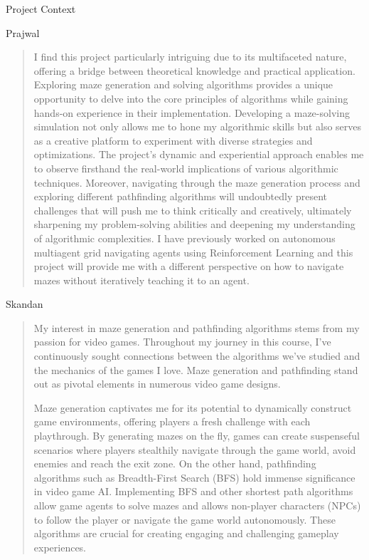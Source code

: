 \documentclass{amsart}
\begin{document}
\begin{section}{Project Context}
    \begin{subsection}{Prajwal}
        \begin{quote}
            I find this project particularly intriguing due to its multifaceted nature, offering a bridge between theoretical knowledge and practical application. Exploring maze generation and solving algorithms provides a unique opportunity to delve into the core principles of algorithms while gaining hands-on experience in their implementation. Developing a maze-solving simulation not only allows me to hone my algorithmic skills but also serves as a creative platform to experiment with diverse strategies and optimizations. The project's dynamic and experiential approach enables me to observe firsthand the real-world implications of various algorithmic techniques. Moreover, navigating through the maze generation process and exploring different pathfinding algorithms will undoubtedly present challenges that will push me to think critically and creatively, ultimately sharpening my problem-solving abilities and deepening my understanding of algorithmic complexities. I have previously worked on autonomous multiagent grid navigating agents using Reinforcement Learning and this project will provide me with a different perspective on how to navigate mazes without iteratively teaching it to an agent.
        \end{quote}
    \end{subsection}

    \begin{subsection}{Skandan}
        \begin{quote}
            My interest in maze generation and pathfinding algorithms stems from my passion for video games. Throughout my journey in this course, I've continuously sought connections between the algorithms we've studied and the mechanics of the games I love. Maze generation and pathfinding stand out as pivotal elements in numerous video game designs.
            
            Maze generation captivates me for its potential to dynamically construct game environments, offering players a fresh challenge with each playthrough. By generating mazes on the fly, games can create suspenseful scenarios where players stealthily navigate through the game world, avoid enemies and reach the exit zone. On the other hand, pathfinding algorithms such as Breadth-First Search (BFS) hold immense significance in video game AI. Implementing BFS and other shortest path algorithms allow game agents to solve mazes and allows non-player characters (NPCs) to follow the player or navigate the game world autonomously. These algorithms are crucial for creating engaging and challenging gameplay experiences.    
        \end{quote}
    \end{subsection}
    
\end{section}
\end{document}

